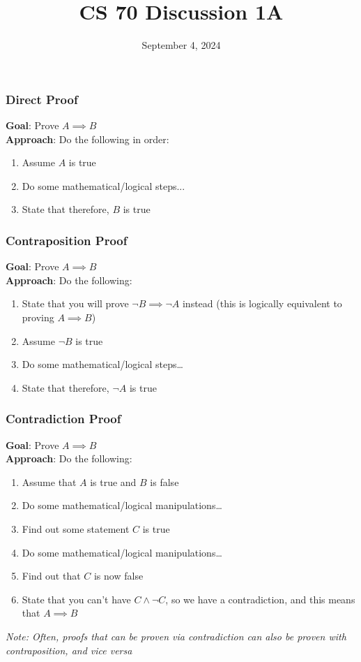 \documentclass{beamer}
\title{CS 70 Discussion 1A}
\date{September 4, 2024}
\begin{document}
\frame{\titlepage}

\begin{frame}
\frametitle{Direct Proof}
{\bf Goal}: Prove $A\implies B$\\
{\bf Approach}: Do the following in order:
\begin{enumerate}
    \item Assume $A$ is true
    \item Do some mathematical/logical steps...
    \item State that therefore, $B$ is true
\end{enumerate}
\end{frame}

\begin{frame}
\frametitle{Contraposition Proof}
{\bf Goal}: Prove $A\implies B$\\
{\bf Approach}: Do the following:
\begin{enumerate}
    \item State that you will prove $\neg B\implies\neg A$ instead (this is logically equivalent to proving $A\implies B$)
    \item Assume $\neg B$ is true
    \item Do some mathematical/logical steps\dots
    \item State that therefore, $\neg A$ is true
\end{enumerate}
\end{frame}

\begin{frame}
\frametitle{Contradiction Proof}
{\bf Goal}: Prove $A\implies B$\\
{\bf Approach}: Do the following:
\begin{enumerate}
    \item Assume that $A$ is true and $B$ is false
    \item Do some mathematical/logical manipulations\dots
    \item Find out some statement $C$ is true
    \item Do some mathematical/logical manipulations\dots
    \item Find out that $C$ is now false
    \item State that you can't have $C\wedge\neg C$, so we have a contradiction, and this means that $A\implies B$
\end{enumerate}
{\it Note: Often, proofs that can be proven via contradiction can also be proven with contraposition, and vice versa}
\end{frame}
\end{document}
